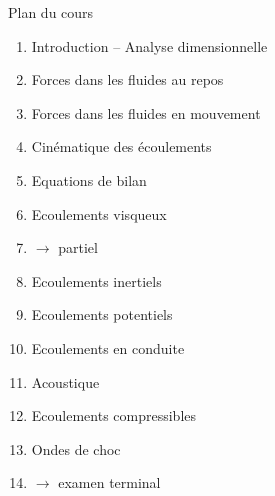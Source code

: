 \begin{frame}{Plan du cours}

\small

\begin{enumerate}
\item
  Introduction -- Analyse dimensionnelle
\item
  Forces dans les fluides au repos
\item 
  Forces dans les fluides en mouvement
\item
  Cinématique des écoulements
\item
  Equations de bilan
\item
  Ecoulements visqueux
\smallskip
\item[] \qquad $\rightarrow$ partiel
\smallskip
\item
  Ecoulements inertiels
\item
  Ecoulements potentiels
\item
  Ecoulements en conduite
\item
  Acoustique
\item
  Ecoulements compressibles
\item
  Ondes de choc
\smallskip
\item[] \qquad $\rightarrow$ examen terminal
\end{enumerate}

\vspace{5mm}

\end{frame}


